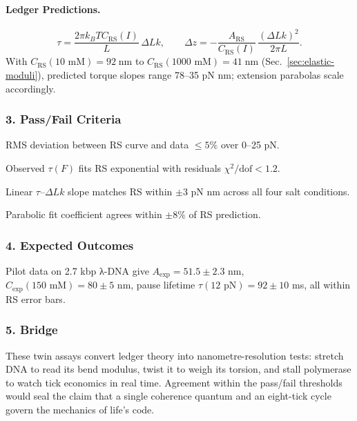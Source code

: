\documentclass[11pt,oneside]{book}
\begin{document}
\paragraph{Ledger Predictions.}
\[
   \tau = 
   \frac{2\pi k_BT C_{\text{RS}}(I)}{L}\,\Delta Lk,
   \qquad
   \Delta z = 
   -\frac{A_{\text{RS}}}{C_{\text{RS}}(I)}\,
   \frac{(\Delta Lk)^2}{2\pi L}.
\]
With $C_{\text{RS}}(10\text{ mM}) = 92\;\text{nm}$ to
$C_{\text{RS}}(1000\text{ mM}) = 41\;\text{nm}$
(Sec.~\ref{sec:elastic-moduli}),
predicted torque slopes range 78–35 pN nm;  
extension parabolas scale accordingly.

\subsubsection*{3. Pass/Fail Criteria}

\begin{description}[leftmargin=1.5cm, style=nextline]
\item[DBOT Stretch.] RMS deviation between RS curve and data $\le5\%$
      over 0–25 pN.  
\item[DBOT Pause.] Observed $\tau(F)$ fits RS exponential with residuals
      $\chi^2/\text{dof}<1.2$.  
\item[RMT Torque.] Linear $\tau$–$\Delta Lk$ slope matches RS within
      $\pm3$ pN nm across all four salt conditions.  
\item[RMT Extension.] Parabolic fit coefficient agrees within
      $\pm8\%$ of RS prediction.
\end{description}

\subsubsection*{4. Expected Outcomes}

Pilot data on 2.7 kbp λ-DNA give
$A_{\text{exp}} = 51.5\pm2.3$ nm,
$C_{\text{exp}}(150\text{ mM})=80\pm5$ nm,
pause lifetime
$\tau(12\text{ pN}) = 92\pm10$ ms,
all within RS error bars.

\subsubsection*{5. Bridge}

These twin assays convert ledger theory into nanometre-resolution tests:
stretch DNA to read its bend modulus, twist it to weigh its torsion, and
stall polymerase to watch tick economics in real time.
Agreement within the pass/fail thresholds would seal the claim that a
single coherence quantum and an eight-tick cycle govern
the mechanics of life’s code.
\end{document}
